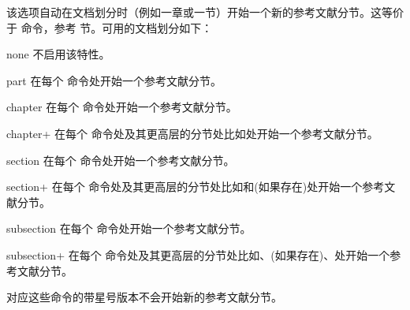 \begin{optionlist}

该选项自动在文档划分时（例如一章或一节）开始一个新的参考文献分节。这等价于  命令，参考  节。可用的文档划分如下：

\begin{valuelist}
\item[none] %
不启用该特性。
\item[part] %
在每个  命令处开始一个参考文献分节。
\item[chapter] %
在每个  命令处开始一个参考文献分节。
\item[chapter+] %
在每个 命令处及其更高层的分节处比如处开始一个参考文献分节。

\item[section] %
在每个  命令处开始一个参考文献分节。

\item[section+] %
在每个 命令处及其更高层的分节处比如和(如果存在)处开始一个参考文献分节。

\item[subsection] %
在每个  命令处开始一个参考文献分节。
\item[subsection+] %
在每个 命令处及其更高层的分节处比如、(如果存在)、处开始一个参考文献分节。
\end{valuelist}
%
对应这些命令的带星号版本不会开始新的参考文献分节。


\end{optionlist}

